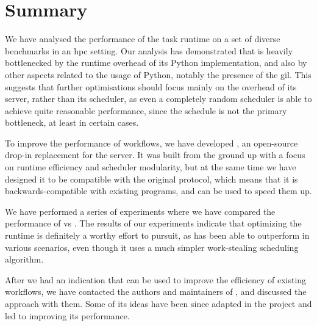 \section{Summary}
We have analysed the performance of the \dask{} task runtime on a set of
diverse benchmarks in an \gls{hpc} setting. Our analysis has demonstrated that
\dask{} is heavily bottlenecked by the runtime overhead of its Python
implementation, and also by other aspects related to the usage of Python, notably the presence of
the \gls{gil}. This suggests that further optimisations should focus mainly on
the overhead of its server, rather than its scheduler, as even a completely random scheduler is
able to achieve quite reasonable performance, since the schedule is not the primary bottleneck, at
least in certain cases.

To improve the performance of \dask{} workflows, we have developed
\rsds{}, an open-source drop-in replacement for the \dask{}
server. It was built from the ground up with a focus on runtime
efficiency and scheduler modularity, but at the same time we have designed it to be compatible with
the original \dask{} protocol, which means that it is backwards-compatible with
existing \dask{} programs, and can be used to speed them up.

We have performed a series of experiments where we have compared the performance of
\rsds{} vs \dask{}. The results of our experiments indicate
that optimizing the runtime is definitely a worthy effort to pursuit, as
\rsds{} has been able to outperform \dask{} in various
scenarios, even though it uses a much simpler work-stealing scheduling algorithm.

After we had an indication that \rsds{} can be used to improve the efficiency
of existing \dask{} workflows, we have contacted the authors and maintainers of
\dask{}, and discussed the \rsds{} approach with
them. Some of its
ideas have been since adapted in the \dask{} project and led to improving its
performance.
